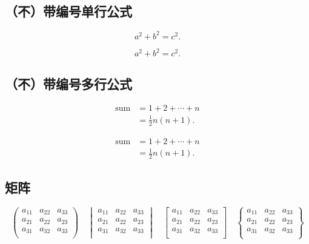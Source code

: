 \documentclass[type = master]{whu-thesis}
\begin{document}
\subsection{（不）带编号单行公式}

\begin{equation}
  a^2 + b^2 = c^2.
\end{equation}

\[ a^2 + b^2 = c^2.\]

\subsection{（不）带编号多行公式}

\begin{align}
  \text{sum} & = 1 + 2 + \cdots + n \\
             & = \frac12 n(n+1).
\end{align}

\begin{align*}
  \text{sum} & = 1 + 2 + \cdots + n \\
             & = \frac12 n(n+1).
\end{align*}

\subsection{矩阵}

\[\begin{pmatrix}
  a_{11} & a_{22} & a_{33} \\
  a_{21} & a_{22} & a_{23} \\
  a_{31} & a_{32} & a_{33} \\
\end{pmatrix} \quad
\begin{vmatrix}
  a_{11} & a_{22} & a_{33} \\
  a_{21} & a_{22} & a_{23} \\
  a_{31} & a_{32} & a_{33} \\
\end{vmatrix} \quad
\begin{bmatrix}
  a_{11} & a_{22} & a_{33} \\
  a_{21} & a_{22} & a_{23} \\
  a_{31} & a_{32} & a_{33} \\
\end{bmatrix} \quad
\begin{Bmatrix}
  a_{11} & a_{22} & a_{33} \\
  a_{21} & a_{22} & a_{23} \\
  a_{31} & a_{32} & a_{33} \\
\end{Bmatrix}\]
\end{document}
